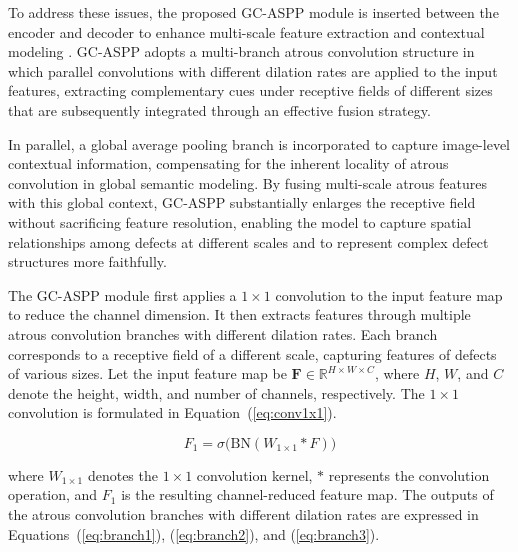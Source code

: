 \documentclass[sn-basic]{sn-jnl}
\theoremstyle{thmstyleone}%
\theoremstyle{thmstyletwo}%
\theoremstyle{thmstylethree}%
\begin{document}
To address these issues, the proposed GC-ASPP module is inserted between the encoder and decoder to enhance multi-scale feature extraction and contextual modeling \cite{Abian2025Atrous}. GC-ASPP adopts a multi-branch atrous convolution structure in which parallel convolutions with different dilation rates are applied to the input features, extracting complementary cues under receptive fields of different sizes that are subsequently integrated through an effective fusion strategy.

In parallel, a global average pooling branch is incorporated to capture image-level contextual information, compensating for the inherent locality of atrous convolution in global semantic modeling. By fusing multi-scale atrous features with this global context, GC-ASPP substantially enlarges the receptive field without sacrificing feature resolution, enabling the model to capture spatial relationships among defects at different scales and to represent complex defect structures more faithfully. 


The GC-ASPP module first applies a $1\times1$ convolution to the input feature map to reduce the channel dimension. It then extracts features through multiple atrous convolution branches with different dilation rates. Each branch corresponds to a receptive field of a different scale, capturing features of defects of various sizes. Let the input feature map be $\mathbf{F}\in\mathbb{R}^{H\times W\times C}$, where $H$, $W$, and $C$ denote the height, width, and number of channels, respectively. The $1\times1$ convolution is formulated in Equation~(\ref{eq:conv1x1}).

\begin{equation}
F_1 = \sigma\big(\text{BN}(W_{1\times 1} \ast F)\big)
\label{eq:conv1x1}
\end{equation}

where $W_{1\times 1}$ denotes the $1\times1$ convolution kernel, $\ast$ represents the convolution operation, and $F_1$ is the resulting channel-reduced feature map. The outputs of the atrous convolution branches with different dilation rates are expressed in Equations~(\ref{eq:branch1}), (\ref{eq:branch2}), and (\ref{eq:branch3}).
\end{document}
